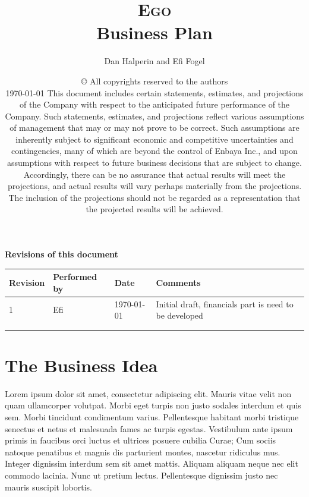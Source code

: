 \documentclass[11pt,titlepage]{article}
\begin{document}
\title{{\Huge\textsc{Ego}}\\Business Plan}
\author{Dan Halperin and Efi Fogel}
\date{\copyright{} All copyrights reserved to the authors\\\today
  \vfill This document includes certain statements, estimates, and projections of the Company with respect to the anticipated future performance of the Company. Such statements, estimates, and projections reflect various assumptions of management that may or may not prove to be correct. Such assumptions are inherently subject to significant economic and competitive uncertainties and contingencies, many of which are beyond the control of Enbaya Inc., and upon assumptions with respect to future business decisions that are subject to change. Accordingly, there can be no assurance that actual results will meet the projections, and actual results will vary perhaps materially from the projections. The inclusion of the projections should not be regarded as a representation that the projected results will be achieved.}
\thispagestyle{empty}
\maketitle
\tableofcontents
\textbf{Revisions of this document}\newline\newline\newline
\begin{tabular}{ | l | l | l | l |}\hline
  Revision & Performed by & Date & Comments \\ \hline
  1 & Efi & \today & Initial draft, financials part is need to be developed\\\hline
  & & &\\\hline
  & & &\\\hline
\end{tabular}
\section{The Business Idea}
Lorem ipsum dolor sit amet, consectetur adipiscing elit. Mauris vitae velit 
non quam ullamcorper volutpat. Morbi eget turpis non justo sodales interdum 
et quis sem. Morbi tincidunt condimentum varius. Pellentesque habitant morbi 
tristique senectus et netus et malesuada fames ac turpis egestas. Vestibulum 
ante ipsum primis in faucibus orci luctus et ultrices posuere cubilia Curae;
Cum sociis natoque penatibus et magnis dis parturient montes, nascetur 
ridiculus mus. Integer dignissim interdum sem sit amet mattis. 
Aliquam aliquam neque nec elit commodo lacinia. Nunc ut pretium lectus. 
Pellentesque dignissim justo nec mauris suscipit lobortis.\newline
\end{document}
